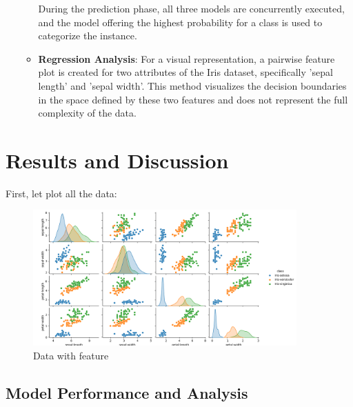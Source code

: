 \documentclass[a4paper]{article}
\begin{document}
\begin{enumerate}
\begin{itemize}
	During the prediction phase, all three models are concurrently executed, and the model offering the highest probability for a class is used to categorize the instance.
	
	\item \textbf{Regression Analysis}:
	For a visual representation, a pairwise feature plot is created for two attributes of the Iris dataset, specifically 'sepal length' and 'sepal width'. This method visualizes the decision boundaries in the space defined by these two features and does not represent the full complexity of the data.
\end{itemize}

\end{enumerate}

\section{Results and Discussion}
First, let plot all the data:
\begin{figure}[h]
	\centering
	\includegraphics[width=0.9\textwidth]{picture/data}
	\caption{Data with feature}
	\label{fig:example}
\end{figure}
\subsection{Model Performance and Analysis}
\end{document}

